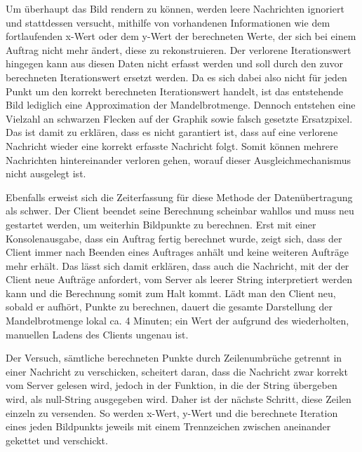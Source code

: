 \documentclass[12pt, onecolumn, notitlepage]{scrartcl}
\begin{document}
Um überhaupt das Bild rendern zu können, werden leere Nachrichten ignoriert und stattdessen versucht, mithilfe von vorhandenen Informationen wie dem fortlaufenden x-Wert oder dem y-Wert der berechneten Werte, der sich bei einem Auftrag nicht mehr ändert, diese zu rekonstruieren. Der verlorene Iterationswert hingegen kann aus diesen Daten nicht erfasst werden und soll durch den zuvor berechneten Iterationswert ersetzt werden. Da es sich dabei also nicht für jeden Punkt um den korrekt berechneten Iterationswert handelt, ist das entstehende Bild lediglich eine Approximation der Mandelbrotmenge. Dennoch entstehen eine Vielzahl an schwarzen Flecken auf der Graphik sowie falsch gesetzte Ersatzpixel. Das ist damit zu erklären, dass es nicht garantiert ist, dass auf eine verlorene Nachricht wieder eine korrekt erfasste Nachricht folgt. Somit können mehrere Nachrichten hintereinander verloren gehen, worauf dieser Ausgleichmechanismus nicht ausgelegt ist. \par

Ebenfalls erweist sich die Zeiterfassung für diese Methode der Datenübertragung als schwer. Der Client beendet seine Berechnung scheinbar wahllos und muss neu gestartet werden, um weiterhin Bildpunkte zu berechnen. Erst mit einer Konsolenausgabe, dass ein Auftrag fertig berechnet wurde, zeigt sich, dass der Client immer nach Beenden eines Auftrages anhält und keine weiteren Aufträge mehr erhält. Das lässt sich damit erklären, dass auch die Nachricht, mit der der Client neue Aufträge anfordert, vom Server als leerer String interpretiert werden kann und die Berechnung somit zum Halt kommt. Lädt man den Client neu, sobald er aufhört, Punkte zu berechnen, dauert die gesamte Darstellung der Mandelbrotmenge lokal ca. 4 Minuten; ein Wert der aufgrund des wiederholten, manuellen Ladens des Clients ungenau ist.\par

Der Versuch, sämtliche berechneten Punkte durch Zeilenumbrüche getrennt in einer Nachricht zu verschicken, scheitert daran, dass die Nachricht zwar korrekt vom Server gelesen wird, jedoch in der Funktion, in die der String übergeben wird, als null-String ausgegeben wird. Daher ist der nächste Schritt, diese Zeilen einzeln zu versenden. So werden x-Wert, y-Wert und die berechnete Iteration eines jeden Bildpunkts jeweils mit einem Trennzeichen zwischen aneinander gekettet und verschickt. 
\end{document}
